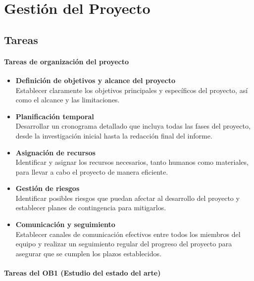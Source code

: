 \chapter{Gestión del Proyecto}\label{cap:gestion_proyecto}

\section{Tareas}\label{sec:tareas}

\subsubsection{Tareas de organización del proyecto}\label{subsubsec:tareas_organizacion}
\begin{itemize}
    \item \textbf{Definición de objetivos y alcance del proyecto} \\
          Establecer claramente los objetivos principales y específicos del proyecto, así como el alcance y las limitaciones.

    \item \textbf{Planificación temporal} \\
          Desarrollar un cronograma detallado que incluya todas las fases del proyecto, desde la investigación inicial hasta la redacción final del informe.

    \item \textbf{Asignación de recursos} \\
          Identificar y asignar los recursos necesarios, tanto humanos como materiales, para llevar a cabo el proyecto de manera eficiente.

    \item \textbf{Gestión de riesgos} \\
          Identificar posibles riesgos que puedan afectar al desarrollo del proyecto y establecer planes de contingencia para mitigarlos.

    \item \textbf{Comunicación y seguimiento} \\
          Establecer canales de comunicación efectivos entre todos los miembros del equipo y realizar un seguimiento regular del progreso del proyecto para asegurar que se cumplen los plazos establecidos.
\end{itemize}

\subsubsection{Tareas del OB1 (Estudio del estado del arte)}\label{subsubsec:tareas_ob1}

